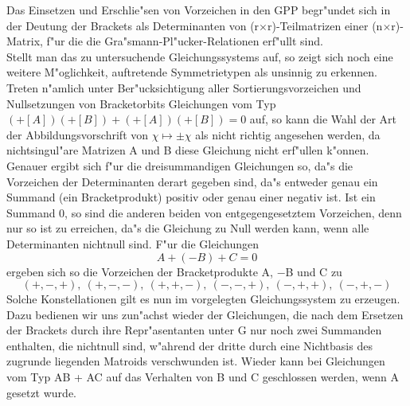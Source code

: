 Das Einsetzen und Erschlie"sen von Vorzeichen in den GPP begr"undet sich
in der Deutung der Brackets als Determinanten von (r$\times$r)-Teilmatrizen
einer (n$\times$r)-Matrix, f"ur die die Gra"smann-Pl"ucker-Relationen erf"ullt
sind.\\
Stellt man das zu untersuchende Gleichungssystems auf, so zeigt sich noch eine
weitere M"oglichkeit, auftretende Symmetrietypen als unsinnig zu erkennen.
Treten n"amlich unter Ber"ucksichtigung aller Sortierungsvorzeichen und
Nullsetzungen von Bracketorbits Gleichungen vom Typ
$(+[A])(+[B]) + (+[A])(+[B]) = 0$ auf, so kann die Wahl der Art der
Abbildungsvorschrift von $\chi\mapsto\pm\chi$ als nicht richtig angesehen
werden, da nichtsingul"are Matrizen A und B diese Gleichung nicht erf"ullen
k"onnen.\\
Genauer ergibt sich f"ur die dreisummandigen Gleichungen so, da"s die
Vorzeichen der Determinanten derart gegeben sind, da"s entweder genau ein
Summand (ein Bracketprodukt) positiv oder genau einer negativ ist. Ist ein
Summand 0, so sind die anderen beiden von entgegengesetztem Vorzeichen, denn nur
so ist zu erreichen, da"s die Gleichung zu Null werden kann, wenn alle
Determinanten nichtnull sind. F"ur die Gleichungen
$$ A + (-B) + C = 0$$
ergeben sich so die Vorzeichen der Bracketprodukte A, $-$B und C zu
$$(+,-,+),~(+,-,-),~(+,+,-),~(-,-,+),~(-,+,+),~(-,+,-)$$
Solche Konstellationen gilt es nun im vorgelegten Gleichungssystem zu erzeugen.
Dazu bedienen wir uns zun"achst wieder der Gleichungen, die nach dem Ersetzen
der Brackets durch ihre Repr"asentanten unter G nur noch zwei Summanden
enthalten, die nichtnull sind, w"ahrend der dritte durch eine Nichtbasis des
zugrunde liegenden Matroids verschwunden ist. Wieder kann bei Gleichungen
vom Typ AB + AC auf das Verhalten von B und C geschlossen werden, wenn A
gesetzt wurde.

